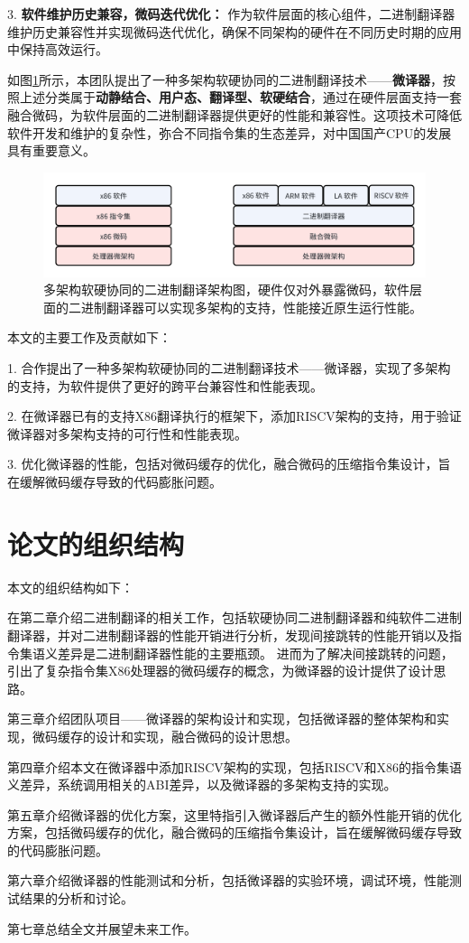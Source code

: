 3. \textbf{软件维护历史兼容，微码迭代优化：} 作为软件层面的核心组件，二进制翻译器维护历史兼容性并实现微码迭代优化，确保不同架构的硬件在不同历史时期的应用中保持高效运行。

如图\ref{img:my_arch}所示，本团队提出了一种多架构软硬协同的二进制翻译技术——\textbf{微译器}，按照上述分类属于\textbf{动静结合、用户态、翻译型、软硬结合}，通过在硬件层面支持一套融合微码，为软件层面的二进制翻译器提供更好的性能和兼容性。这项技术可降低软件开发和维护的复杂性，弥合不同指令集的生态差异，对中国国产CPU的发展具有重要意义。


\begin{figure}[h]
    \centering
    \includegraphics[width=1\linewidth]{./feishuImage/my_arch.png}
    \caption{多架构软硬协同的二进制翻译架构图，硬件仅对外暴露微码，软件层面的二进制翻译器可以实现多架构的支持，性能接近原生运行性能。}
    \label{img:my_arch}
  \end{figure}

本文的主要工作及贡献如下：

1. 合作提出了一种多架构软硬协同的二进制翻译技术——微译器，实现了多架构的支持，为软件提供了更好的跨平台兼容性和性能表现。

2. 在微译器已有的支持X86翻译执行的框架下，添加RISCV架构的支持，用于验证微译器对多架构支持的可行性和性能表现。

3. 优化微译器的性能，包括对微码缓存的优化，融合微码的压缩指令集设计，旨在缓解微码缓存导致的代码膨胀问题。


\section{论文的组织结构}

本文的组织结构如下：

在第二章介绍二进制翻译的相关工作，包括软硬协同二进制翻译器和纯软件二进制翻译器，并对二进制翻译器的性能开销进行分析，发现间接跳转的性能开销以及指令集语义差异是二进制翻译器性能的主要瓶颈。
进而为了解决间接跳转的问题，引出了复杂指令集X86处理器的微码缓存的概念，为微译器的设计提供了设计思路。

第三章介绍团队项目——微译器的架构设计和实现，包括微译器的整体架构和实现，微码缓存的设计和实现，融合微码的设计思想。

第四章介绍本文在微译器中添加RISCV架构的实现，包括RISCV和X86的指令集语义差异，系统调用相关的ABI差异，以及微译器的多架构支持的实现。

第五章介绍微译器的优化方案，这里特指引入微译器后产生的额外性能开销的优化方案，包括微码缓存的优化，融合微码的压缩指令集设计，旨在缓解微码缓存导致的代码膨胀问题。

第六章介绍微译器的性能测试和分析，包括微译器的实验环境，调试环境，性能测试结果的分析和讨论。

第七章总结全文并展望未来工作。

